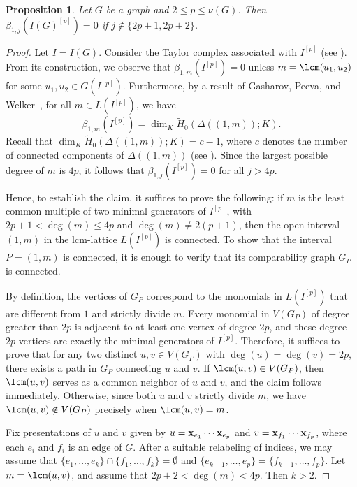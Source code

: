 \documentclass[12pt]{amsart}
\newtheorem{Proposition}[Theorem]{Proposition}
\begin{document}
	\begin{Proposition}\label{thm:betti}
		Let $G$ be a graph and $2\leq p \leq \nu(G)$. Then $\beta_{1,j}(I(G)^{[p]}) = 0$ if $j \notin \{ 2p+1,2p+2\}$.
	\end{Proposition}
		
		\begin{proof}
Let $I = I(G)$. 
Consider the Taylor complex associated with $I^{[p]}$ (see \cite[Section~7.1]{HHmonomialideals}). 
From its construction, we observe that $\beta_{1,m}(I^{[p]}) = 0$ unless $m = \lcm(u_1, u_2)$ for some $u_1, u_2 \in G(I^{[p]})$. 
Furthermore, by a result of Gasharov, Peeva, and Welker~\cite{Gasharov1999}, for all $m \in L(I^{[p]})$, we have
\[
\beta_{1,m}(I^{[p]}) = \dim_K \tilde{H}_0(\Delta((1,m)); K).
\]
Recall that $\dim_K \tilde{H}_0(\Delta((1,m)); K) = c - 1$, where $c$ denotes the number of connected components of $\Delta((1,m))$ (see \cite[Chapter~1, Section~7]{MJ}). 
Since the largest possible degree of $m$ is $4p$, it follows that $\beta_{1,j}(I^{[p]}) = 0$ for all $j > 4p$. 

Hence, to establish the claim, it suffices to prove the following:  
if $m$ is the least common multiple of two minimal generators of $I^{[p]}$, with $2p + 1 < \deg(m) \le 4p$ and $\deg(m) \ne 2(p + 1)$, then the open interval $(1, m)$ in the lcm-lattice $L(I^{[p]})$ is connected. 
To show that the interval $P = (1, m)$ is connected, it is enough to verify that its comparability graph $G_P$ is connected.

By definition, the vertices of $G_P$ correspond to the monomials in $L(I^{[p]})$ that are different from $1$ and strictly divide $m$. 
Every monomial in $V(G_P)$ of degree greater than $2p$ is adjacent to at least one vertex of degree $2p$, and these degree $2p$ vertices are exactly the minimal generators of $I^{[p]}$. 
Therefore, it suffices to prove that for any two distinct $u, v \in V(G_P)$ with $\deg(u) = \deg(v) = 2p$, there exists a path in $G_P$ connecting $u$ and $v$. 
If $\lcm(u,v) \in V(G_P)$, then $\lcm(u,v)$ serves as a common neighbor of $u$ and $v$, and the claim follows immediately. 
Otherwise, since both $u$ and $v$ strictly divide $m$, we have $\lcm(u,v) \notin V(G_P)$ precisely when $\lcm(u,v) = m$.

Fix presentations of $u$ and $v$ given by $u = {\bf x}_{e_1} \cdots {\bf x}_{e_p}$ and $v = {\bf x}_{f_1} \cdots {\bf x}_{f_p}$, where each $e_i$ and $f_i$ is an edge of $G$. After a suitable relabeling of indices, we may assume that $\{e_1, \ldots, e_k\} \cap \{f_1, \ldots, f_k\} = \emptyset$ and $\{e_{k+1}, \ldots, e_p\} = \{f_{k+1}, \ldots, f_p\}.$ Let $m = \lcm(u,v)$, and assume that $2p + 2 < \deg(m) < 4p$. 
Then $k > 2$. 


\end{proof}
\end{document}
